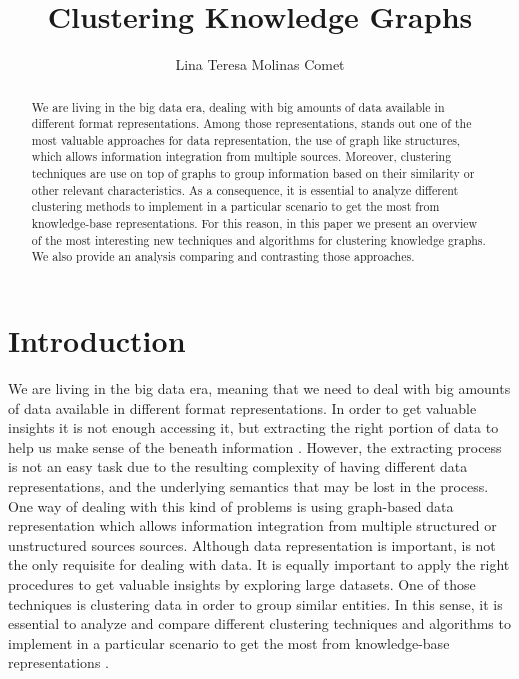 \documentclass[runningheads]{llncs}
\begin{document}
%
\title{Clustering Knowledge Graphs}
%
%
\author{Lina Teresa Molinas Comet}
%
%
%
\maketitle              %
%
\begin{abstract}
We are living in the big data era, dealing with big amounts of data available in different format representations. Among those representations, stands out one of the most valuable approaches for data representation, the use of graph like structures, which allows information integration from multiple sources. Moreover, clustering techniques are use on top of graphs to group information based on their similarity or other relevant characteristics. As a consequence, it is essential to analyze different clustering methods to implement in a particular scenario to get the most from knowledge-base representations. For this reason, in this paper we present an overview of the most interesting new techniques and algorithms for clustering knowledge graphs. We also provide an analysis comparing and contrasting those approaches.

\end{abstract}
%
%
%
\section{Introduction} \label{introduction}
We are living in the big data era, meaning that we need to deal with big amounts of data available in different format representations. In order to get valuable insights it is not enough accessing it, but extracting the right portion of data to help us make sense of the beneath information \cite{Pedrycz}. However, the extracting process is not an easy task due to the resulting complexity of having different data representations, and the underlying semantics that may be lost in the process. One way of dealing with this kind of problems is using graph-based data representation which allows information integration from multiple structured or unstructured sources sources.
Although data representation is important, is not the only requisite for dealing with data. It is equally important to apply the right procedures to get valuable insights by exploring large datasets. One of those techniques is clustering data in order to group similar entities.  In this sense, it is essential to analyze and compare different clustering techniques and algorithms to implement in a particular scenario to get the most from knowledge-base representations \cite{Pedrycz}.
\end{document}
